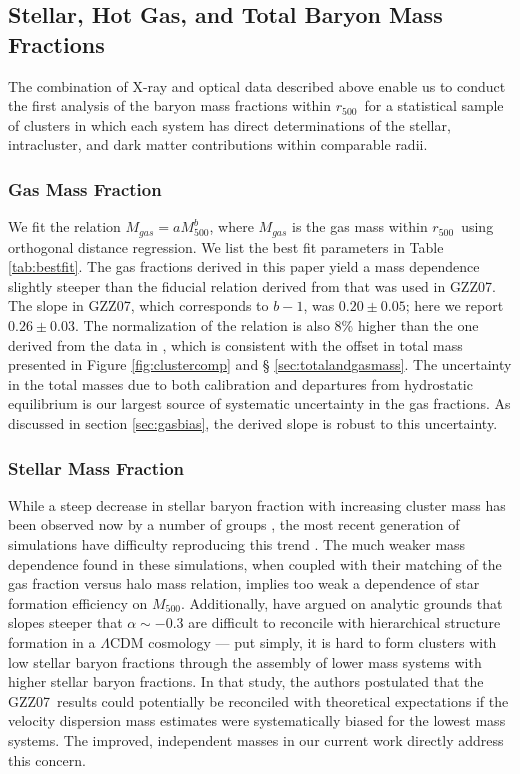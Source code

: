 \documentclass[preprint]{emulateapj}
\newcommand\rfive{$r_{500}$}
\newcommand\ptwo{GZZ07}
\newcommand\mfive{${M}_{500}$}
\begin{document}
\subsection{Stellar, Hot Gas, and Total Baryon Mass Fractions}

The combination of X-ray and optical data described above enable us to
conduct the first analysis of the baryon mass fractions within \rfive\
for a statistical sample of clusters in which each system has direct
determinations of the stellar, intracluster, and dark matter
contributions within comparable radii.

\subsubsection{Gas Mass Fraction}
\label{sec:gascomp}
We fit the relation $M_{gas}=a M_{500}^b$, where $M_{gas}$ is the gas
mass within \rfive\, using orthogonal distance regression. We list the
best fit parameters in Table \ref{tab:bestfit}.  The gas fractions
derived in this paper yield a mass dependence slightly steeper than
the fiducial relation derived from \citet{vikhlinin2006} that was used
in \ptwo. The slope in \ptwo, which corresponds to $b-1$, was
$0.20\pm0.05$; here we report $0.26\pm0.03$.  The normalization of the
relation is also 8\% higher than the one derived from the data in
\citet{vikhlinin2006}, which is consistent with the offset in total
mass presented in Figure \ref{fig:clustercomp} and \S
\ref{sec:totalandgasmass}.  The uncertainty in the total 
masses due to both calibration and departures from hydrostatic equilibrium
is our largest source of systematic uncertainty in the gas fractions. As discussed in
section \ref{sec:gasbias}, the derived slope is robust to this uncertainty.


\subsubsection{Stellar Mass Fraction}
\label{sec:sbf}


While a steep decrease in stellar baryon fraction with increasing
cluster mass has been observed now by a number of groups \citep[e.g.,
GZZ07;][]{giodini2009,andreon2010,zhang2011,lin2012}, the most recent
generation of simulations have difficulty reproducing this trend
\citep[e.g.,][]{kravtsov2009,puchwein2010,young2011}. 
The much weaker mass dependence found in these simulations, when coupled with
their matching of the gas fraction versus halo mass relation, implies too weak a
dependence of star formation efficiency on \mfive.
Additionally, 
\cite{balogh2008} have argued
on analytic grounds that slopes steeper that $\alpha\sim-0.3$ are
difficult to reconcile with hierarchical structure formation in a
$\Lambda$CDM cosmology --- put simply, it is hard to form clusters
with low stellar baryon fractions through the assembly of lower mass
systems with higher stellar baryon fractions. In that study, the
authors postulated that the \ptwo\ results could potentially be
reconciled with theoretical expectations if the velocity dispersion
mass estimates were systematically biased for the lowest mass
systems. The improved, independent masses in our current work directly
address this concern.
 
\end{document}
